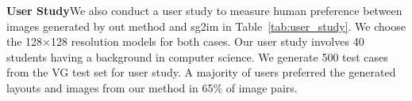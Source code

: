 \noindent\textbf{User Study}\quad We also conduct a user study to measure human preference between images generated by out method and sg2im in Table~\ref{tab:user_study}. We choose the 128$\times$128 resolution models for both cases. %
Our user study involves 40 students having a background in computer science. We generate 500 test cases from the VG test set for user study. %
A majority of users preferred the generated layouts and images from our method in 65\% of image pairs.%


